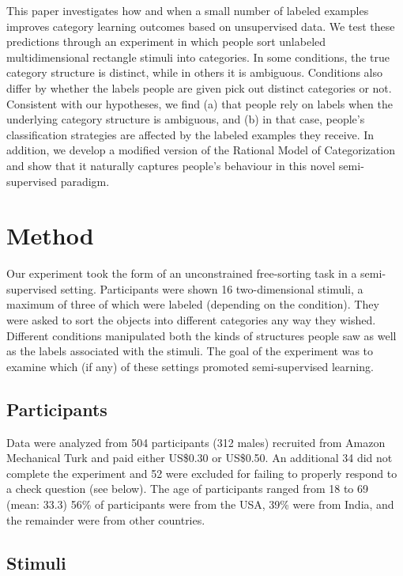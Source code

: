 \documentclass[a4paper, doc]{apa6}
\begin{document}
This paper investigates how and when a small number of labeled examples improves category learning outcomes based on unsupervised data. We test these predictions through an experiment in which people sort unlabeled multidimensional rectangle stimuli into categories. In some conditions, the true category structure is distinct, while in others it is ambiguous. Conditions also differ by whether the labels people are given pick out distinct categories or not. Consistent with our hypotheses, we find (a) that people rely on labels when the underlying category structure is ambiguous, and (b) in that case, people's classification strategies are affected by the labeled examples they receive. In addition, we develop a modified version of the Rational Model of Categorization \cite{anderson1991adaptive} and show that it naturally captures people's behaviour in this novel semi-supervised paradigm.

\section{Method}

Our experiment took the form of an unconstrained free-sorting task in a semi-supervised setting. Participants were shown 16 two-dimensional stimuli, a maximum of three of which were labeled (depending on the condition). They were asked to sort the objects into different categories any way they wished. Different conditions manipulated both the kinds of structures people saw as well as the labels associated with the stimuli. The goal of the experiment was to examine which (if any) of these settings promoted semi-supervised learning.


\subsection{Participants}

Data were analyzed from 504 participants (312 males) recruited from Amazon Mechanical Turk and paid either US\$0.30 or US\$0.50. An additional 34 did not complete the experiment and 52 were excluded for failing to properly respond to a check question (see below). The age of participants ranged from 18 to 69 (mean: 33.3) %
56\% of participants were from the USA, 39\% were from India, and the remainder were from other countries.

\subsection{Stimuli}
\end{document}
